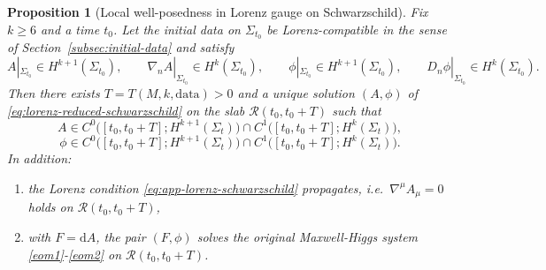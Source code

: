 \documentclass[11pt]{article}
\numberwithin{equation}{section}
\theoremstyle{plain}
\newtheorem{proposition}[theorem]{Proposition}
\theoremstyle{definition}
\theoremstyle{remark}
\newcommand{\dd}{\mathrm{d}}
\begin{document}
\begin{proposition}[Local well-posedness in Lorenz gauge on Schwarzschild]\label{prop:local-wp-schwarzschild}
Fix $k\ge 6$ and a time $t_0$.
Let the initial data on $\Sigma_{t_0}$ be Lorenz-compatible in the sense of Section~\ref{subsec:initial-data} and satisfy
\begin{equation}\label{eq:app-schwarzschild-data-sobolev}
A|_{\Sigma_{t_0}}\in H^{k+1}(\Sigma_{t_0}),
\qquad
\nabla_n A|_{\Sigma_{t_0}}\in H^{k}(\Sigma_{t_0}),
\qquad
\phi|_{\Sigma_{t_0}}\in H^{k+1}(\Sigma_{t_0}),
\qquad
D_n\phi|_{\Sigma_{t_0}}\in H^{k}(\Sigma_{t_0}).
\end{equation}
Then there exists $T=T(M,k,\text{data})>0$ and a unique solution $(A,\phi)$ of \eqref{eq:lorenz-reduced-schwarzschild} on the slab $\mathcal R(t_0,t_0+T)$ such that
\begin{equation}
A\in C^0\!\bigl([t_0,t_0+T];H^{k+1}(\Sigma_t)\bigr)\cap C^1\!\bigl([t_0,t_0+T];H^{k}(\Sigma_t)\bigr),
\end{equation}
\begin{equation}
\phi\in C^0\!\bigl([t_0,t_0+T];H^{k+1}(\Sigma_t)\bigr)\cap C^1\!\bigl([t_0,t_0+T];H^{k}(\Sigma_t)\bigr).
\end{equation}
In addition:
\begin{enumerate}
\item[(i)] the Lorenz condition \eqref{eq:app-lorenz-schwarzschild} propagates, i.e.\ $\nabla^\mu A_\mu=0$ holds on $\mathcal R(t_0,t_0+T)$,
\item[(ii)] with $F=\dd A$, the pair $(F,\phi)$ solves the original Maxwell-Higgs system \eqref{eom1}-\eqref{eom2} on $\mathcal R(t_0,t_0+T)$.
\end{enumerate}
\end{proposition}
\end{document}
